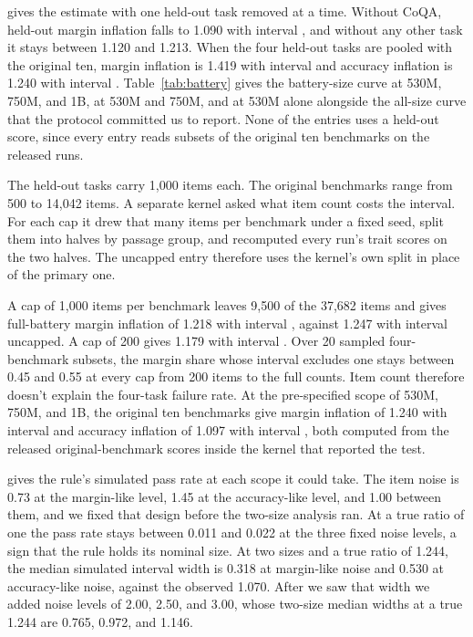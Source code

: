  gives the estimate with one held-out task removed at a time. Without CoQA, held-out margin inflation falls to 1.090 with interval , and without any other task it stays between 1.120 and 1.213. When the four held-out tasks are pooled with the original ten, margin inflation is 1.419 with interval  and accuracy inflation is 1.240 with interval . Table~\ref{tab:battery} gives the battery-size curve at 530M, 750M, and 1B, at 530M and 750M, and at 530M alone alongside the all-size curve that the protocol committed us to report. None of the entries uses a held-out score, since every entry reads subsets of the original ten benchmarks on the released runs.

The held-out tasks carry 1,000 items each. The original benchmarks range from 500 to 14,042 items. A separate kernel asked what item count costs the interval. For each cap it drew that many items per benchmark under a fixed seed, split them into halves by passage group, and recomputed every run's trait scores on the two halves. The uncapped entry therefore uses the kernel's own split in place of the primary one.

A cap of 1,000 items per benchmark leaves 9,500 of the 37,682 items and gives full-battery margin inflation of 1.218 with interval , against 1.247 with interval  uncapped. A cap of 200 gives 1.179 with interval . Over 20 sampled four-benchmark subsets, the margin share whose interval excludes one stays between 0.45 and 0.55 at every cap from 200 items to the full counts. Item count therefore doesn't explain the four-task failure rate. At the pre-specified scope of 530M, 750M, and 1B, the original ten benchmarks give margin inflation of 1.240 with interval  and accuracy inflation of 1.097 with interval , both computed from the released original-benchmark scores inside the kernel that reported the test.

 gives the rule's simulated pass rate at each scope it could take. The item noise is 0.73 at the margin-like level, 1.45 at the accuracy-like level, and 1.00 between them, and we fixed that design before the two-size analysis ran. At a true ratio of one the pass rate stays between 0.011 and 0.022 at the three fixed noise levels, a sign that the rule holds its nominal size. At two sizes and a true ratio of 1.244, the median simulated interval width is 0.318 at margin-like noise and 0.530 at accuracy-like noise, against the observed 1.070. After we saw that width we added noise levels of 2.00, 2.50, and 3.00, whose two-size median widths at a true 1.244 are 0.765, 0.972, and 1.146.

